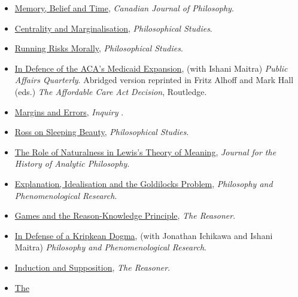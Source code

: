 \documentclass[
  10pt,
  letterpaper,
  DIV=11,
  numbers=noendperiod,
  twoside]{scrartcl}
\begin{document}
\begin{itemize}
\item
  \href{https://brian.weatherson.org/quarto/posts/mbt/memory-belief-and-time.html}{Memory,
  Belief and Time}, \emph{Canadian Journal of Philosophy}.
\item
  \href{https://brian.weatherson.org/quarto/posts/herman/centrality-and-marginalisation.html}{Centrality
  and Marginalisation}, \emph{Philosophical Studies}.
\item
  \href{https://brian.weatherson.org/quarto/posts/rrm/running-risks-morally.html}{Running
  Risks Morally}, \emph{Philosophical Studies}.
\item
  \href{https://brian.weatherson.org/quarto/posts/aca/aca-medicaid.html}{In
  Defence of the ACA's Medicaid Expansion}, (with Ishani Maitra)
  \emph{Public Affairs Quarterly}. Abridged version reprinted in Fritz
  Alhoff and Mark Hall (eds.) \emph{The Affordable Care Act Decision},
  Routledge.
\item
  \href{https://brian.weatherson.org/quarto/posts/mae/margins-and-errors.html}{Margins
  and Errors}, \emph{Inquiry} .
\item
  \href{https://brian.weatherson.org/quarto/posts/ross-sleeping-beauty/ross-on-sleeping-beauty.html}{Ross
  on Sleeping Beauty}, \emph{Philosophical Studies}.
\item
  \href{https://brian.weatherson.org/quarto/posts/naturalness/the-role-of-naturalness-in-lewiss-theory-of-meaning.html}{The
  Role of Naturalness in Lewis's Theory of Meaning}, \emph{Journal for
  the History of Analytic Philosophy}.
\item
  \href{https://brian.weatherson.org/quarto/posts/eigp/goldilocks.html}{Explanation,
  Idealisation and the Goldilocks Problem}, \emph{Philosophy and
  Phenomenological Research}.
\item
  \href{https://brian.weatherson.org/quarto/posts/gark/games-and-the-reason-knowledge-principle.html}{Games
  and the Reason-Knowledge Principle}, \emph{The Reasoner}.
\item
  \href{https://brian.weatherson.org/quarto/posts/idakd/in-defense-of-a-kripkean-dogma.html}{In
  Defense of a Kripkean Dogma}, (with Jonathan Ichikawa and Ishani
  Maitra) \emph{Philosophy and Phenomenological Research}.
\item
  \href{https://brian.weatherson.org/quarto/posts/ias/induction-and-supposition.html}{Induction
  and Supposition}, \emph{The Reasoner}.
\item
  \href{https://brian.weatherson.org/quarto/posts/tgp/the-temporal-generality-problem.html}{The
}
\end{itemize}
\end{document}
